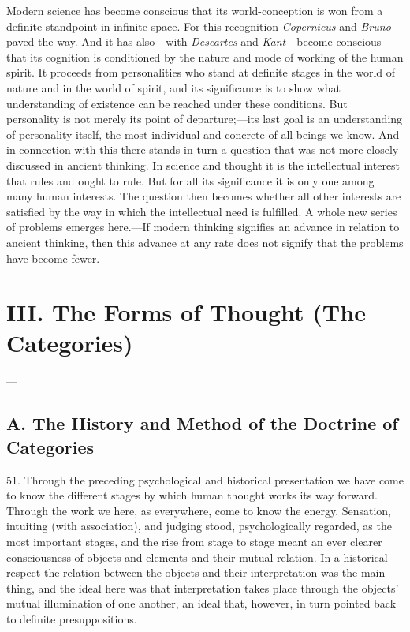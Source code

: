 \documentclass[12pt,a4paper]{book}
\newcommand{\opage}[1]{\marginnote{\footnotesize\textit{[#1]}}}
\begin{document}
\opage{134}Modern science has become conscious that its world-conception is won
from a definite standpoint in infinite space. For this recognition
\emph{Copernicus} and \emph{Bruno} paved the way. And it has also---with
\emph{Descartes} and \emph{Kant}---become conscious that its cognition is
conditioned by the nature and mode of working of the human spirit. It
proceeds from personalities who stand at definite stages in the world of
nature and in the world of spirit, and its significance is to show what
understanding of existence can be reached under these conditions. But
personality is not merely its point of departure;---its last goal is an
understanding of personality itself, the most individual and concrete of all
beings we know. And in connection with this there stands in turn a question
that was not more closely discussed in ancient thinking. In science and
thought it is the intellectual interest that rules and ought to rule. But
for all its significance it is only one among many human interests. The
question then becomes whether all other interests are satisfied by the way
in which the intellectual need is fulfilled. A whole new series of problems
emerges here.---If modern thinking signifies an advance in relation to
ancient thinking, then this advance at any rate does not signify that the
problems have become fewer.

\chapter*{III. The Forms of Thought (The Categories)}
\label{ch:former}

\begin{center}---\end{center}

\section*{A. The History and Method of the Doctrine of Categories}
\label{sec:kategorilaere-historie}

\opage{135}51. Through the preceding psychological and historical presentation we
have come to know the different stages by which human thought works its
way forward. Through the work we here, as everywhere, come to know the
energy. Sensation, intuiting (with association), and judging stood,
psychologically regarded, as the most important stages, and the rise from
stage to stage meant an ever clearer consciousness of objects and elements
and their mutual relation. In a historical respect the relation between the
objects and their interpretation was the main thing, and the ideal here was
that interpretation takes place through the objects' mutual illumination of
one another, an ideal that, however, in turn pointed back to definite
presuppositions.
\end{document}
